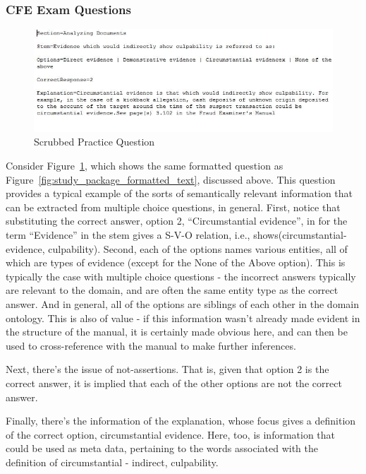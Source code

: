 \subsubsection{CFE Exam Questions}

\begin{figure}
\centering
\vspace{2.0in}
\includegraphics[scale=0.75]{study_package_formatted_text.jpg}
\caption{Scrubbed Practice Question}
\label{fig:study_package_formatted_text_2}
\end{figure}

Consider Figure~\ref{fig:study_package_formatted_text_2}, which shows the same formatted question as 
Figure~\ref{fig:study_package_formatted_text}, discussed above.   This question provides a typical 
example of the sorts of semantically relevant information that can be extracted from multiple choice
questions, in general.  First, notice that substituting the correct answer, option 2, ``Circumstantial 
evidence'', in for the term ``Evidence'' in the stem gives a S-V-O relation, i.e., 
shows(circumstantial-evidence, culpability).  Second, each of the options names various entities, all of 
which are types of evidence (except for the None of the Above option).  This is typically the case with multiple choice questions - the incorrect answers typically are relevant to the domain, and are often
the same entity type as the correct answer.  And in general, all of the options are siblings of each
other in the domain ontology.  This is also of value - if this information wasn't already made evident
in the structure of the manual, it is certainly made obvious here, and can then be used to cross-reference
with the manual to make further inferences.

Next, there's the issue of not-assertions.  That is, given that option 2 is the correct answer, it is 
implied that each of the other options are not the correct answer.

Finally, there's the information of the explanation, whose focus gives a definition of the correct option,
circumstantial evidence.  Here, too, is information that could be used as meta data, pertaining to the 
words associated with the definition of circumstantial - indirect, culpability.  


